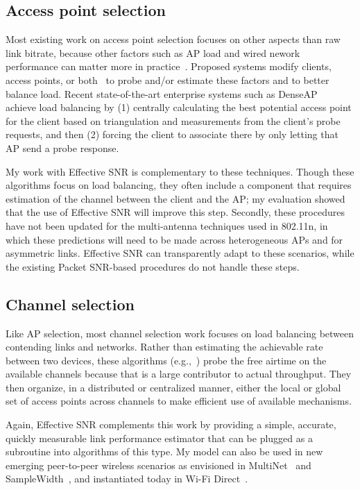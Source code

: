 \subsection{Access point selection}
Most existing work on access point selection focuses on other aspects than raw link bitrate, because other factors such as AP load and wired nework performance can matter more in practice~\cite{Balachandran_AP,Judd_AP}. Proposed systems modify clients, access points, or both~\cite{Balachandran_AP,Berjerano_AP,Nicholson_AP,Vasudevan_AP} to probe and/or estimate these factors and to better balance load. Recent state-of-the-art enterprise systems such as DenseAP~\cite{Murty_DenseAP} achieve load balancing by (1) centrally calculating the best potential access point for the client based on triangulation and measurements from the client's probe requests, and then (2) forcing the client to associate there by only letting that AP send a probe response.

My work with Effective SNR is complementary to these techniques. Though these algorithms focus on load balancing, they often include a component that requires estimation of the channel between the client and the AP; my evaluation showed that the use of Effective SNR will improve this step. Secondly, these procedures have not been updated for the multi-antenna techniques used in 802.11n, in which these predictions will need to be made across heterogeneous APs and for asymmetric links. Effective SNR can transparently adapt to these scenarios, while the existing Packet SNR-based procedures do not handle these steps.

\subsection{Channel selection}
Like AP selection, most channel selection work focuses on load balancing between contending links and networks. Rather than estimating the achievable rate between two devices, these algorithms (e.g.,~\cite{Akella_Chan,Athanasiou_LAC,Kauffmann_Chan,Rozner_Chan}) probe the free airtime on the available channels because that is a large contributor to actual throughput. They then organize, in a distributed or centralized manner, either the local or global set of access points across channels to make efficient use of available mechanisms.

Again, Effective SNR complements this work by providing a simple, accurate, quickly measurable link performance estimator that can be plugged as a subroutine into algorithms of this type. My model can also be used in new emerging peer-to-peer wireless scenarios as envisioned in MultiNet~\cite{Chandra_MultiNet} and SampleWidth~\cite{Chandra_SampleWidth}, and instantiated today in Wi-Fi Direct~\cite{wifi_direct}.

